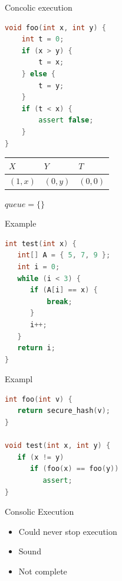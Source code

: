 \documentclass{beamer}
\begin{document}
\begin{frame}[fragile]{Concolic execution}
\begin{minipage}{0.49\textwidth}
\begin{lstlisting}[language=C++,escapechar=@]
void foo(int x, int y) {
    int t = 0;
    if (x > y) {
        t = x;
    } else {
        t = y;
    }
    if (t < x) {
        assert false;
    }
}
\end{lstlisting}
\end{minipage}
\hfill
\begin{minipage}{0.49\textwidth}
\begin{center}
\begin{tabular}{ | l | l | l | }
\hline
$X$ & $Y$ & $T$ \\
\hline
$(1, x)$ & $(0, y)$ & $(0, 0)$ \\
\hline
\end{tabular}
$queue = \{\}$
\end{center}
\end{minipage}
\end{frame}

\begin{frame}[fragile]{Example}
\begin{minipage}{0.49\textwidth}
\begin{lstlisting}[language=C++]
int test(int x) {
   int[] A = { 5, 7, 9 };
   int i = 0;
   while (i < 3) {
      if (A[i] == x) {
          break;
      }
      i++;
   }
   return i;
}
\end{lstlisting}
\end{minipage}
\begin{minipage}{0.49\textwidth}
\end{minipage}
\end{frame}

\begin{frame}[fragile]{Exampl}
\begin{minipage}{0.40\textwidth}
\begin{lstlisting}[language=C++]
int foo(int v) {
   return secure_hash(v);
}

void test(int x, int y) {
   if (x != y)
      if (foo(x) == foo(y))
         assert;
}
\end{lstlisting}
\end{minipage}
\hfill
\begin{minipage}{0.40\textwidth}
\end{minipage}
\end{frame}

\begin{frame}{Consolic Execution}
\begin{itemize}
\item Could never stop execution
\item Sound
\item Not complete
\end{itemize}
\end{frame}
\end{document}
